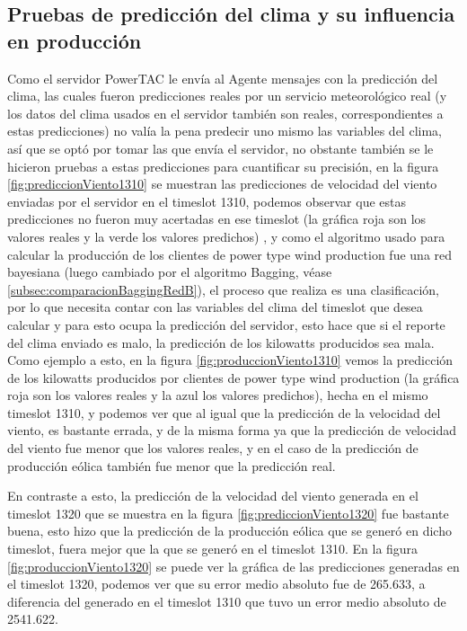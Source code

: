 \subsection{Pruebas de predicción del clima y su influencia en producción} \label{subsec:prediccionClimaProduccion}

Como el servidor PowerTAC le envía al Agente mensajes con la predicción del clima, las cuales fueron predicciones reales por un servicio meteorológico real (y los datos del clima usados en el servidor también son reales, correspondientes a estas predicciones) no valía la pena predecir uno mismo las variables del clima, así que se optó por tomar las que envía el servidor, no obstante también se le hicieron pruebas a estas predicciones para cuantificar su precisión, en la figura \ref{fig:prediccionViento1310} se muestran las predicciones de velocidad del viento enviadas por el servidor en el timeslot 1310, podemos observar que estas predicciones no fueron muy acertadas en ese timeslot (la gráfica roja son los valores reales y la verde los valores predichos) , y como el algoritmo usado para calcular la producción de los clientes de power type wind production fue una red bayesiana (luego cambiado por el algoritmo Bagging, véase \ref{subsec:comparacionBaggingRedB}), el proceso que realiza es una clasificación, por lo que necesita contar con las variables del clima del timeslot que desea calcular y para esto ocupa la predicción del servidor, esto hace que si el reporte del clima enviado es malo, la predicción de los kilowatts producidos sea mala. Como ejemplo a esto, en la figura \ref{fig:produccionViento1310} vemos la predicción de los kilowatts producidos por clientes de power type wind production (la gráfica roja son los valores reales y la azul los valores predichos), hecha en el mismo timeslot 1310, y podemos ver que al igual que la predicción de la velocidad del viento, es bastante errada, y de la misma forma ya que la predicción de velocidad del viento fue menor que los valores reales, y en el caso de la predicción de producción eólica también fue menor que la predicción real.

En contraste a esto, la predicción de la velocidad del viento generada en el timeslot 1320 que se muestra en la figura \ref{fig:prediccionViento1320} fue bastante buena, esto hizo que la predicción de la producción eólica que se generó en dicho timeslot, fuera mejor que la que se generó en el timeslot 1310. En la figura \ref{fig:produccionViento1320} se puede ver la gráfica de las predicciones generadas en el timeslot 1320, podemos ver que su error medio absoluto fue de 265.633, a diferencia del generado en el timeslot 1310 que tuvo un error medio absoluto de 2541.622.

